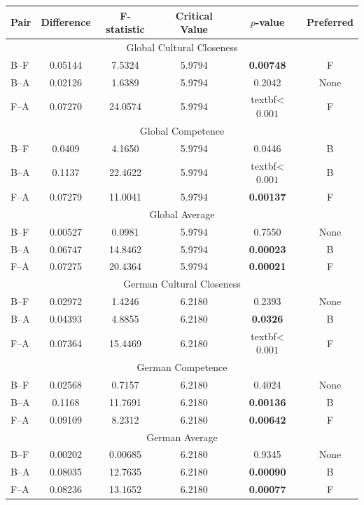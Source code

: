 \begin{table}[!ht]
\centering
\begin{tabular}{lccccc}
\toprule
\textbf{Pair} & \textbf{Difference} & \textbf{F-statistic} & \textbf{Critical Value} & \textbf{$p$-value} & \textbf{Preferred} \\
\midrule
\multicolumn{6}{c}{Global Cultural Closeness} \\
\midrule
B--F & 0.05144 & 7.5324 & 5.9794 & \textbf{0.00748} & F \\
B--A & 0.02126 & 1.6389 & 5.9794 & 0.2042 & None \\
F--A & 0.07270 & 24.0574 & 5.9794 & textbf{< $0.001$} & F \\
\midrule
\multicolumn{6}{c}{Global Competence} \\
\midrule
B--F & 0.0409 & 4.1650 & 5.9794 & 0.0446 & B \\
B--A & 0.1137 & 22.4622 & 5.9794 & textbf{< $0.001$} & B \\
F--A & 0.07279 & 11.0041 & 5.9794 & \textbf{0.00137} & F \\
\midrule
\multicolumn{6}{c}{Global Average} \\
\midrule
B--F & 0.00527 & 0.0981 & 5.9794 & 0.7550 & None \\
B--A & 0.06747 & 14.8462 & 5.9794 & \textbf{0.00023} & B \\
F--A & 0.07275 & 20.4364 & 5.9794 & \textbf{0.00021} & F \\
\midrule
\multicolumn{6}{c}{German Cultural Closeness} \\
\midrule
B--F & 0.02972 & 1.4246 & 6.2180 & 0.2393 & None \\
B--A & 0.04393 & 4.8855 & 6.2180 & \textbf{0.0326} & B \\
F--A & 0.07364 & 15.4469 & 6.2180 & textbf{< $0.001$} & F \\
\midrule
\multicolumn{6}{c}{German Competence} \\
\midrule
B--F & 0.02568 & 0.7157 & 6.2180 & 0.4024 & None \\
B--A & 0.1168 & 11.7691 & 6.2180 & \textbf{0.00136} & B \\
F--A & 0.09109 & 8.2312 & 6.2180 & \textbf{0.00642} & F \\
\midrule
\multicolumn{6}{c}{German Average} \\
\midrule
B--F & 0.00202 & 0.00685 & 6.2180 & 0.9345 & None \\
B--A & 0.08035 & 12.7635 & 6.2180 & \textbf{0.00090} & B \\
F--A & 0.08236 & 13.1652 & 6.2180 & \textbf{0.00077} & F \\

\end{tabular}
\end{table}
